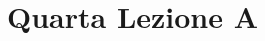 \documentclass[10pt,a4paper]{article}
\begin{document}
\begin{center}
\end{center}

\newpage

\section{Quarta Lezione A}
\end{document}
